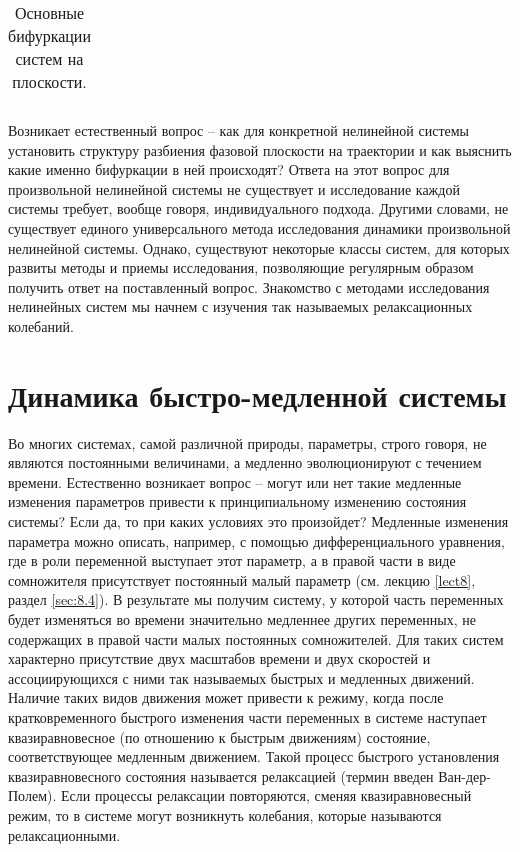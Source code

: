 \begin{table}[h]
        \centering
        \caption{Основные бифуркации систем на плоскости.}
        \label{tab:10.1}
        \begin{tabular}{c}
            
        \end{tabular}
\end{table}

Возникает естественный вопрос – как для конкретной нелинейной
системы установить структуру разбиения фазовой плоскости на траектории и
как выяснить какие именно бифуркации в ней происходят? Ответа на этот
вопрос для произвольной нелинейной системы не существует и исследование
каждой системы требует, вообще говоря, индивидуального подхода. Другими
словами, не существует единого универсального метода исследования
динамики произвольной нелинейной системы. Однако, существуют некоторые
классы систем, для которых развиты методы и приемы исследования,
позволяющие регулярным образом получить ответ на поставленный вопрос.
Знакомство с методами исследования нелинейных систем мы начнем с
изучения так называемых релаксационных колебаний.


\section{Динамика быстро-медленной системы}%
\label{sec:10.3}

Во многих системах, самой различной природы, параметры, строго
говоря, не являются постоянными величинами, а медленно эволюционируют с
течением времени. Естественно возникает вопрос – могут или нет такие
медленные изменения параметров привести к принципиальному изменению
состояния системы? Если да, то при каких условиях это произойдет?
Медленные изменения параметра можно описать, например, с помощью
дифференциального уравнения, где в роли переменной выступает этот
параметр, а в правой части в виде сомножителя присутствует постоянный
малый параметр (см. лекцию \ref{lect8}, раздел \ref{sec:8.4}). В результате мы получим систему, у
которой часть переменных будет изменяться во времени значительно
медленнее других переменных, не содержащих в правой части малых
постоянных сомножителей. Для таких систем характерно присутствие двух
масштабов времени и двух скоростей и ассоциирующихся с ними так
называемых быстрых и медленных движений. Наличие таких видов движения
может привести к режиму, когда после кратковременного быстрого изменения
части переменных в системе наступает квазиравновесное (по отношению к
быстрым движениям) состояние, соответствующее медленным движением.
Такой процесс быстрого установления квазиравновесного состояния называется
релаксацией (термин введен Ван-дер-Полем). Если процессы релаксации
повторяются, сменяя квазиравновесный режим, то в системе могут возникнуть
колебания, которые называются релаксационными.

